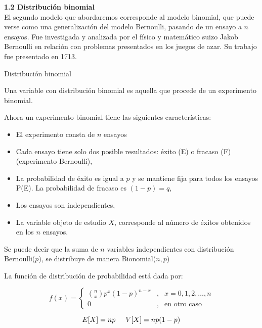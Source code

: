 \documentclass[base=hide,12pt]{elegantbook}
\begin{document}
\textcolor{col4}{\LARGE  \bf 1.2 Distribución binomial }\\

El segundo modelo que abordaremos corresponde al modelo binomial, que puede verse como una generalización del modelo Bernoulli, pasando de un ensayo a $n$ ensayos. Fue investigada y analizada por el físico y matemático suizo Jakob Bernoulli en relación con problemas presentados en los juegos de azar. Su trabajo fue presentado en 1713. \\

\begin{Box2}{Distribución binomial}
	
	Una variable con distribución binomial es aquella que procede de un experimento binomial. 
	
	Ahora un experimento binomial tiene las siguientes características: 
	
	\begin{itemize}
		\item El experimento consta de $n$ ensayos 
		\item Cada ensayo tiene solo dos posible resultados: éxito (E) o fracaso (F) (experimento Bernoulli),
		\item La probabilidad de éxito es igual a $p$ y se mantiene fija para todos los ensayos P(E). La probabilidad de fracaso es $(1-p)=q$,
		\item Los ensayos son independientes,
		\item La variable objeto de estudio $X$, corresponde al número de éxitos obtenidos en los $n$ ensayos.
	\end{itemize}
	Se puede decir que la suma de $n$ variables independientes con distribución Bernoulli($p$), se distribuye de manera Bionomial($n,p$)
	
	La función de distribución de probabilidad está dada por:
	
	\begin{equation*}
		f(x)=\left\lbrace
		\begin{array}{lll}
			\displaystyle\binom{n}{x} p^{x} (1-p)^{n-x} &,& x=0,1,2, \ldots, n   \\
			0 &,& \mbox{en otro caso}
		\end{array}
		\right.
	\end{equation*}
	
	$$E[X]=np \hspace{.5cm} V[X]= np(1-p) $$
\end{Box2}
\end{document}
